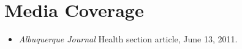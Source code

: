 \documentclass[11pt]{article}
\begin{document}

  \section{Media Coverage}
  \begin{itemize}
  \item \textit{Albuquerque Journal} Health section article, June 13, 2011.
  \end{itemize}

\end{document}
